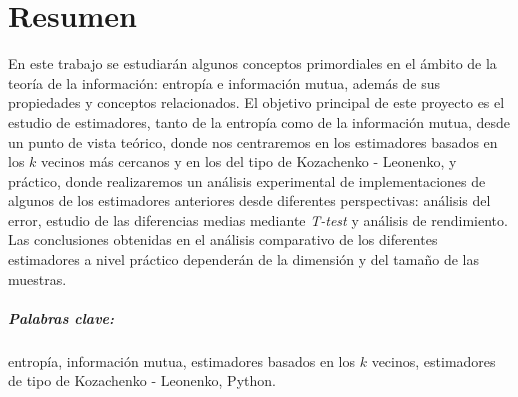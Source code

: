 \chapter*{Resumen}

En este trabajo se estudiarán algunos conceptos primordiales en el ámbito de la teoría de la información: entropía e información mutua, además de sus propiedades y conceptos relacionados. El objetivo principal de este proyecto es el estudio de estimadores, tanto de la entropía como de la información mutua, desde un punto de vista teórico, donde nos centraremos en los estimadores basados en los $k$ vecinos más cercanos y en los del tipo de Kozachenko - Leonenko, y práctico, donde realizaremos un análisis experimental de implementaciones de algunos de los estimadores anteriores desde diferentes perspectivas: análisis del error, estudio de las diferencias medias mediante \textit{T-test} y análisis de rendimiento. Las conclusiones obtenidas en el análisis comparativo de los diferentes estimadores a nivel práctico dependerán de la dimensión y del tamaño de las muestras.\\

\paragraph{Palabras clave:} entropía, información mutua, estimadores basados en los $k$ vecinos, estimadores de tipo de Kozachenko - Leonenko, Python.
